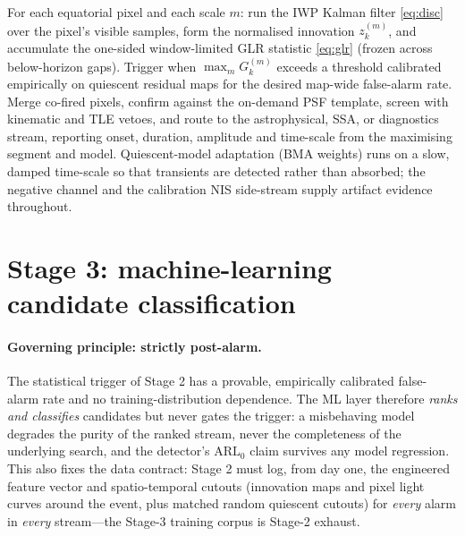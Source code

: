 \documentclass[11pt]{article}
\begin{document}
For each equatorial pixel and each scale $m$: run the IWP Kalman filter \eqref{eq:disc} over the
pixel's visible samples, form the normalised innovation $z_k^{(m)}$, and accumulate the one-sided
window-limited GLR statistic \eqref{eq:glr} (frozen across below-horizon gaps). Trigger when
$\max_m G_k^{(m)}$ exceeds a threshold calibrated empirically on quiescent residual maps for the
desired map-wide false-alarm rate. Merge co-fired pixels, confirm against the on-demand PSF
template, screen with kinematic and TLE vetoes, and route to the astrophysical, SSA, or diagnostics
stream, reporting onset, duration, amplitude and time-scale from the maximising segment and model.
Quiescent-model adaptation (BMA weights) runs on a slow, damped time-scale so that transients are
detected rather than absorbed; the negative channel and the calibration NIS side-stream supply
artifact evidence throughout.

\section{Stage 3: machine-learning candidate classification}
\label{sec:stage3}

\paragraph{Governing principle: strictly post-alarm.} The statistical trigger of Stage 2 has a
provable, empirically calibrated false-alarm rate and no training-distribution dependence. The ML
layer therefore \emph{ranks and classifies} candidates but never gates the trigger: a misbehaving
model degrades the purity of the ranked stream, never the completeness of the underlying search,
and the detector's $\mathrm{ARL}_0$ claim survives any model regression. This also fixes the data
contract: Stage 2 must log, from day one, the engineered feature vector and spatio-temporal cutouts
(innovation maps and pixel light curves around the event, plus matched random quiescent cutouts)
for \emph{every} alarm in \emph{every} stream---the Stage-3 training corpus is Stage-2 exhaust.
\end{document}
